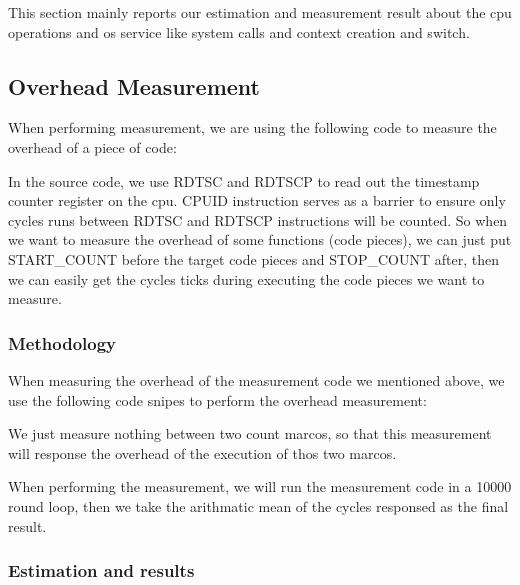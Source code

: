 
This section mainly reports our estimation and measurement result about the cpu operations and os service like system calls and context creation and switch.


\subsection{Overhead Measurement}
When performing measurement, we are using the following code to measure the overhead of a piece of code:



In the source code, we use RDTSC and RDTSCP to read out the timestamp counter register on the cpu. CPUID instruction serves as a barrier to ensure only cycles
runs between RDTSC and RDTSCP instructions will be counted. So when we want to measure the overhead of some functions (code pieces), we can just put START\_COUNT
before the target code pieces and STOP\_COUNT after, then we can easily get the cycles ticks during executing the code pieces we want to measure.


\subsubsection{Methodology}
When measuring the overhead of the measurement code we mentioned above, we use the following code snipes to perform the overhead measurement:



We just measure nothing between two count marcos, so that this measurement will response the overhead of the execution of thos two marcos.

When performing the measurement, we will run the measurement code in a 10000 round loop, then we take the arithmatic mean of the cycles responsed as the final result.


\subsubsection{Estimation and results}
\label{overhead_estimation}

